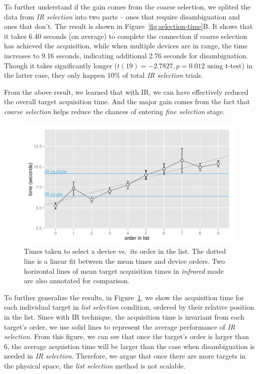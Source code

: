 To further understand if the gain comes from the coarse selection, we splited the data from {\em IR selection} into two parts -- ones that require disambiguation and ones that don't. The result is shown in Figure~\ref{fig:selection-time}B. It shows that it takes 6.40 seconds (on average) to complete the connection if coarse selection has achieved the acquisition, while when multiple devices are in range, the time increases to 9.16 seconds, indicating additional 2.76 seconds for disambiguation. Though it takes significantly longer ($t(19)=-2.7827, p=0.012$ using t-test) in the latter case, they only happen 10\% of total {\em IR selection} trials.

From the above result, we learned that with IR, we can have effectively reduced the overall target acquisition time. And the major gain comes from the fact that {\em coarse selection} helps reduce the chances of entering {\em fine selection} stage. 

\begin{figure}[t]
\centering
\includegraphics[width=1.0\columnwidth]{figures/R_List_by_Target.pdf}
\caption{Times taken to select a device vs.~its order in the list. The dotted line is a linear fit between the mean times and device orders. Two horizontal lines of mean target acquisition times in {\em infrared} mode are also annotated for comparison.}
\label{fig:time-vs-list-order}
\end{figure}

To further generalize the results, in Figure~\ref{fig:time-vs-list-order}, we show the acquisition time for each individual target in {\em list selection} condition, ordered by their relative position in the list. Since with IR technique, the acquisition time is invariant from each target's order, we use solid lines to represent the average performance of {\em IR selection}. From this figure, we can see that once the target's order is larger than 6, the average acquistion time will be larger than the case when disambiguation is needed in {\em IR selection}. Therefore, we argue that once there are more targets in the physical space, the {\em list selection} method is not scalable.

